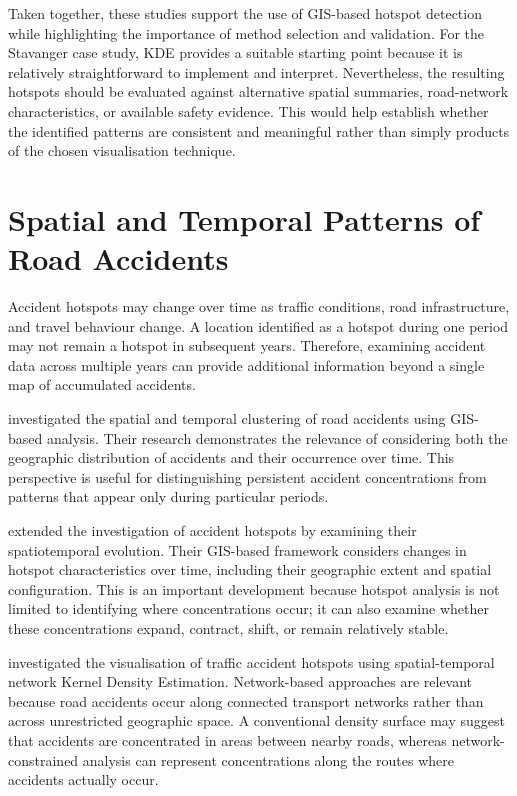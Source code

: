 Taken together, these studies support the use of GIS-based hotspot detection while highlighting the importance of method selection and validation. For the Stavanger case study, KDE provides a suitable starting point because it is relatively straightforward to implement and interpret. Nevertheless, the resulting hotspots should be evaluated against alternative spatial summaries, road-network characteristics, or available safety evidence. This would help establish whether the identified patterns are consistent and meaningful rather than simply products of the chosen visualisation technique.


\section{Spatial and Temporal Patterns of Road Accidents}
\label{sec:lit-topic-2}
Accident hotspots may change over time as traffic conditions, road infrastructure, and travel behaviour change. A location identified as a hotspot during one period may not remain a hotspot in subsequent years. Therefore, examining accident data across multiple years can provide additional information beyond a single map of accumulated accidents.

\textcite{Prasannakumar2011} investigated the spatial and temporal clustering of road accidents using GIS-based analysis. Their research demonstrates the relevance of considering both the geographic distribution of accidents and their occurrence over time. This perspective is useful for distinguishing persistent accident concentrations from patterns that appear only during particular periods.

\textcite{AlHamami2021} extended the investigation of accident hotspots by examining their spatiotemporal evolution. Their GIS-based framework considers changes in hotspot characteristics over time, including their geographic extent and spatial configuration. This is an important development because hotspot analysis is not limited to identifying where concentrations occur; it can also examine whether these concentrations expand, contract, shift, or remain relatively stable.

\textcite{Romano2017} investigated the visualisation of traffic accident hotspots using spatial-temporal network Kernel Density Estimation. Network-based approaches are relevant because road accidents occur along connected transport networks rather than across unrestricted geographic space. A conventional density surface may suggest that accidents are concentrated in areas between nearby roads, whereas network-constrained analysis can represent concentrations along the routes where accidents actually occur.

